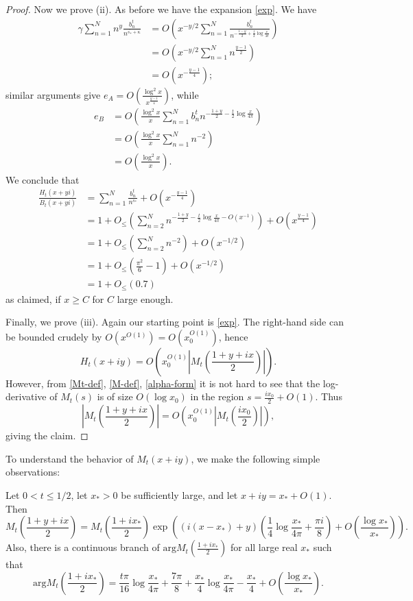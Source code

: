 \begin{proof}
Now we prove (ii).  As before we have the expansion \eqref{exp}.  We have
\begin{align*}
\gamma \sum_{n=1}^N n^y \frac{b_n^t}{n^{\overline{s_*} + \kappa}} &= O\left( x^{-y/2} \sum_{n=1}^N \frac{b_n^t}{n^{-\frac{1-y}{2} + \frac{t}{2} \log \frac{x}{4\pi}}} \right) \\
&= O\left( x^{-y/2} \sum_{n=1}^N n^{\frac{y-1}{2}} \right) \\
&= O(x^{-\frac{y-1}{4}});
\end{align*}
similar arguments give $e_A = O( \frac{\log^2 x}{x^{\frac{y-1}{4}}} )$, while
\begin{align*}
e_B &= O\left( \frac{\log^2 x}{x} \sum_{n=1}^N b_n^t n^{-\frac{1+y}{2}-\frac{t}{2} \log \frac{x}{4\pi}} \right) \\
&= O\left( \frac{\log^2 x}{x} \sum_{n=1}^N n^{-2} \right) \\
&= O\left( \frac{\log^2 x}{x} \right).
\end{align*}
We conclude that
\begin{align*}
\frac{H_t(x+yi)}{B_t(x+yi)} &= \sum_{n=1}^N \frac{b_n^t}{n^{s_*}} + O( x^{-\frac{y-1}{4}} ) \\
&= 1 + O_{\leq}\left( \sum_{n=2}^N n^{-\frac{1+y}{2} - \frac{t}{2} \log \frac{x}{4\pi} - O(x^{-1})} \right) + O( x^{\frac{y-1}{4}} ) \\
&= 1 + O_{\leq}\left( \sum_{n=2}^N n^{-2} \right) + O( x^{-1/2}) \\
&= 1 + O_{\leq}\left( \frac{\pi^2}{6} - 1 \right) + O( x^{-1/2} ) \\
&= 1 + O_{\leq}( 0.7 )
\end{align*}
as claimed, if $x \geq C$ for $C$ large enough.

Finally, we prove (iii).  Again our starting point is \eqref{exp}.  The right-hand side can be bounded crudely by $O( x^{O(1)}) = O(x_0^{O(1)})$, hence
$$ H_t(x+iy) = O\left( x_0^{O(1)} \left|M_t\left( \frac{1+y+ix}{2} \right)\right| \right).$$
However, from \eqref{Mt-def}, \eqref{M-def}, \eqref{alpha-form} it is not hard to see that the log-derivative of $M_t(s)$ is of size $O( \log x_0 )$ in the region $s = \frac{ix_0}{2} + O(1)$.  Thus
$$ \left|M_t\left( \frac{1+y+ix}{2} \right)\right| = O\left( x_0^{O(1)} \left|M_t\left( \frac{ix_0}{2} \right)\right| \right),$$
giving the claim.
\end{proof}

To understand the behavior of $M_t(x+iy)$, we make the following simple observations:

\begin{lemma}[Behavior of $M_t$]\label{mtform}  Let $0 < t \leq 1/2$, let $x_* > 0$ be sufficiently large, and let $x+iy = x_* + O(1)$.  Then
$$ M_t\left(\frac{1+y+ix}{2}\right) = M_t\left(\frac{1+ix_*}{2}\right) \exp\left( (i(x-x_*)+y) \left(\frac{1}{4} \log \frac{x_*}{4\pi} + \frac{\pi i}{8}\right) + O\left( \frac{\log x_*}{x_*}\right) \right).$$
Also, there is a continuous branch of $\mathrm{arg} M_t\left(\frac{1+ix_*}{2}\right)$ for all large real $x_*$ such that
$$ \mathrm{arg} M_t\left(\frac{1+ix_*}{2}\right) = \frac{t \pi}{16} \log \frac{x_*}{4\pi} + \frac{7\pi}{8} 
+ \frac{x_*}{4} \log \frac{x_*}{4\pi} - \frac{x_*}{4} + O( \frac{\log x_*}{x_*} ).$$
\end{lemma}

